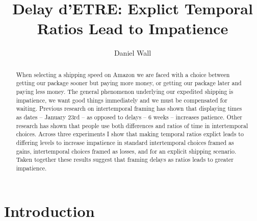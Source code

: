 \documentclass[]{article}
\title{Delay d'ETRE: Explict Temporal Ratios Lead to Impatience}
\author{Daniel Wall}
\begin{document}
\maketitle

\begin{abstract}
	When selecting a shipping speed on Amazon we are faced with a choice between getting our package sooner but paying more money, or getting our package later and paying less money. 
	The general phenomenon underlying our expedited shipping is impatience, we want good things immediately and we must be compensated for waiting. 
	Previous research on intertemporal framing has shown that displaying times as dates -- January 23rd -- as opposed to delays -- 6 weeks -- increases patience. 
	Other research has shown that people use both differences and ratios of time in intertemporal choices. 
	Across three experiments I show that making temporal ratios explict leads to differing levels to increase impatience in standard  intertemporal choices framed as gains, intertemporal choices framed as losses, and for an explicit shipping scenario. 
	Taken together these results suggest that framing delays as ratios leads to greater impatience.
	 
%
	
\end{abstract}

\section{Introduction}
\end{document}

